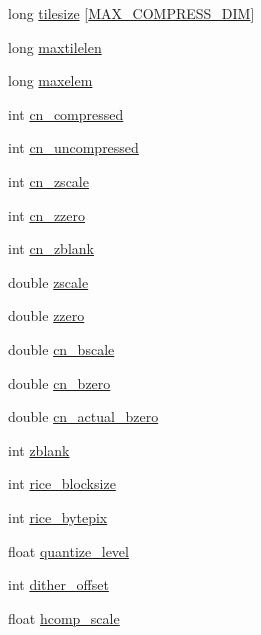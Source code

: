 \begin{DoxyCompactItemize}
\item 
long \hyperlink{struct_f_i_t_sfile_aa5e3b4487acdef0cbaa71fc09ecccd1c}{tilesize} \mbox{[}\hyperlink{fitsio_8h_a490098c3c66339cb8e66ec352707f0d4}{M\+A\+X\+\_\+\+C\+O\+M\+P\+R\+E\+S\+S\+\_\+\+D\+IM}\mbox{]}
\item 
long \hyperlink{struct_f_i_t_sfile_a610fb376061a2bae7ec750def1ccb067}{maxtilelen}
\item 
long \hyperlink{struct_f_i_t_sfile_a7f62ae9fcc956c00bbfa2473ca08aefd}{maxelem}
\item 
int \hyperlink{struct_f_i_t_sfile_a00eeecb333d60314e9c6aad364a2c6c9}{cn\+\_\+compressed}
\item 
int \hyperlink{struct_f_i_t_sfile_a8bbce8f52e094ca59577594db531f54e}{cn\+\_\+uncompressed}
\item 
int \hyperlink{struct_f_i_t_sfile_ae794906db5e359af2ebb1e228ab78884}{cn\+\_\+zscale}
\item 
int \hyperlink{struct_f_i_t_sfile_ab7fa9985c1e606e17aae7aa405e6e92c}{cn\+\_\+zzero}
\item 
int \hyperlink{struct_f_i_t_sfile_abd9e6d3033a4e7cb5fbc6ae2dca110fd}{cn\+\_\+zblank}
\item 
double \hyperlink{struct_f_i_t_sfile_a75b683d8db4f2acc96ed39e4249ca264}{zscale}
\item 
double \hyperlink{struct_f_i_t_sfile_a02930842674ceaf944372231964cd506}{zzero}
\item 
double \hyperlink{struct_f_i_t_sfile_a64f07e62e3875a4db501cd65968a39c4}{cn\+\_\+bscale}
\item 
double \hyperlink{struct_f_i_t_sfile_a2bab440ad0d9186d65da112ea40c4342}{cn\+\_\+bzero}
\item 
double \hyperlink{struct_f_i_t_sfile_a84011f3d4ed08124c7c4a55271f8c8a4}{cn\+\_\+actual\+\_\+bzero}
\item 
int \hyperlink{struct_f_i_t_sfile_ac8f64a2c9327505cd6c9d1dd37037fdd}{zblank}
\item 
int \hyperlink{struct_f_i_t_sfile_ac8a275b27999153533f11acbe8a502b0}{rice\+\_\+blocksize}
\item 
int \hyperlink{struct_f_i_t_sfile_ac4544f7b56af4f0b85155036942b9300}{rice\+\_\+bytepix}
\item 
float \hyperlink{struct_f_i_t_sfile_a2d912ab2e06fd9972ba34d9332b55dea}{quantize\+\_\+level}
\item 
int \hyperlink{struct_f_i_t_sfile_a826eee0849b0d215f3ad3d23a5496b29}{dither\+\_\+offset}
\item 
float \hyperlink{struct_f_i_t_sfile_af480ec626d0aa5a28578a9bb3b8bb70c}{hcomp\+\_\+scale}

\end{DoxyCompactItemize}
